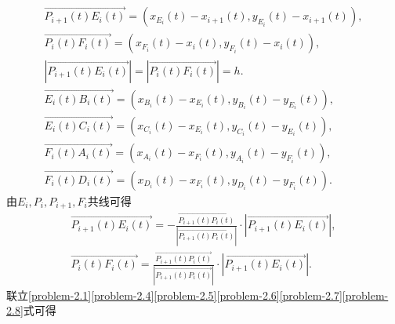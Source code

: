 \documentclass{cumcmthesis}
\begin{document}
    \begin{gather}
    \overrightarrow{P_{i+1}\left( t \right) E_i\left( t \right) }=\left( x_{E_i}\left( t \right) -x_{i+1}\left( t \right) ,y_{E_i}\left( t \right) -x_{i+1}\left( t \right) \right) ,\label{problem-2.4}
    \\
    \overrightarrow{P_i\left( t \right) F_i\left( t \right) }=\left( x_{F_i}\left( t \right) -x_i\left( t \right) ,y_{F_i}\left( t \right) -x_i\left( t \right) \right) ,\label{problem-2.5}
    \\
    \left| \overrightarrow{P_{i+1}\left( t \right) E_i\left( t \right) } \right|=\left| \overrightarrow{P_i\left( t \right) F_i\left( t \right) } \right|=h.\label{problem-2.6}
    \\
    \overrightarrow{E_i\left( t \right) B_i\left( t \right) }=\left( x_{B_i}\left( t \right) -x_{E_i}\left( t \right) ,y_{B_i}\left( t \right) -y_{E_i}\left( t \right) \right) ,\label{problem-2..1}
    \\
    \overrightarrow{E_i\left( t \right) C_i\left( t \right) }=\left( x_{C_i}\left( t \right) -x_{E_i}\left( t \right) ,y_{C_i}\left( t \right) -y_{E_i}\left( t \right) \right) ,\label{problem-2..2}
    \\
    \overrightarrow{F_i\left( t \right) A_i\left( t \right) }=\left( x_{A_i}\left( t \right) -x_{F_i}\left( t \right) ,y_{A_i}\left( t \right) -y_{F_i}\left( t \right) \right) ,\label{problem-2..3}
    \\
    \overrightarrow{F_i\left( t \right) D_i\left( t \right) }=\left( x_{D_i}\left( t \right) -x_{F_i}\left( t \right) ,y_{D_i}\left( t \right) -y_{F_i}\left( t \right) \right) .\label{problem-2..4}
    \end{gather}
    由$E_i,P_i,P_{i+1},F_i$共线可得
    \begin{gather}
    \overrightarrow{P_{i+1}\left( t \right) E_i\left( t \right) }=-\frac{\overrightarrow{P_{i+1}\left( t \right) P_i\left( t \right) }}{\left| \overrightarrow{P_{i+1}\left( t \right) P_i\left( t \right) } \right|}\cdot \left| \overrightarrow{P_{i+1}\left( t \right) E_i\left( t \right) } \right|,\label{problem-2.7}
    \\
    \overrightarrow{P_i\left( t \right) F_i\left( t \right) }=\frac{\overrightarrow{P_{i+1}\left( t \right) P_i\left( t \right) }}{\left| \overrightarrow{P_{i+1}\left( t \right) P_i\left( t \right) } \right|}\cdot \left| \overrightarrow{P_{i+1}\left( t \right) E_i\left( t \right) } \right|.\label{problem-2.8}
    \end{gather}
    联立\eqref{problem-2.1}\eqref{problem-2.4}\eqref{problem-2.5}\eqref{problem-2.6}\eqref{problem-2.7}\eqref{problem-2.8}式可得
\end{document}
